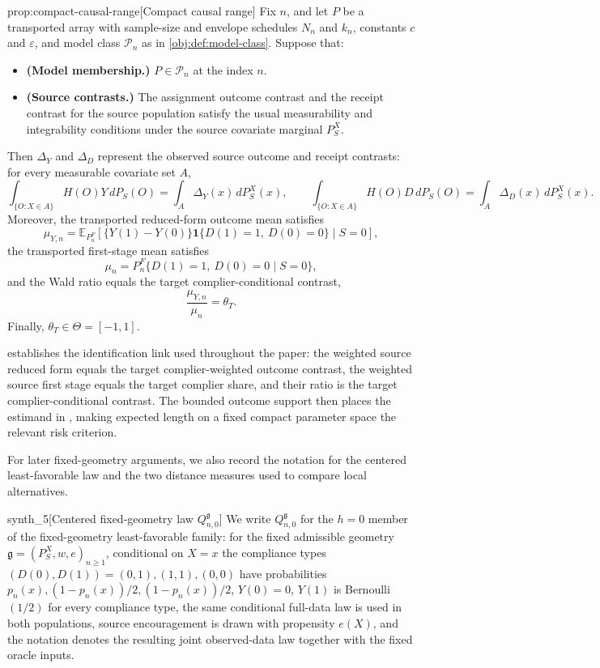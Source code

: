 \begin{theoremv}{prop:compact-causal-range}[Compact causal range]
Fix \(n\), and let \(P\) be a transported array with sample-size and envelope schedules \(N_n\) and \(k_n\), constants \(c\) and \(\varepsilon\), and model class \(\mathcal P_n\) as in \cref{obj:def:model-class}. Suppose that:
\begin{itemize}
\item \textbf{(Model membership.)} \(P\in\mathcal P_n\) at the index \(n\).
\item \textbf{(Source contrasts.)} The assignment outcome contrast and the receipt contrast for the source population satisfy the usual measurability and integrability conditions under the source covariate marginal \(P_S^X\).
\end{itemize}
Then \(\Delta_Y\) and \(\Delta_D\) represent the observed source outcome and receipt contrasts: for every measurable covariate set \(A\),
\[
\int_{\{O:X\in A\}} H(O)Y\,dP_S(O)
=
\int_A \Delta_Y(x)\,dP_S^X(x),
\qquad
\int_{\{O:X\in A\}} H(O)D\,dP_S(O)
=
\int_A \Delta_D(x)\,dP_S^X(x).
\]
Moreover, the transported reduced-form outcome mean satisfies
\[
\mu_{Y,n}
=
\mathbb E_{P_n^F}\!\left[
\{Y(1)-Y(0)\}\mathbf 1\{D(1)=1,\ D(0)=0\}\mid S=0
\right],
\]
the transported first-stage mean satisfies
\[
\mu_n
=
P_n^F\{D(1)=1,\ D(0)=0\mid S=0\},
\]
and the Wald ratio equals the target complier-conditional contrast,
\[
\frac{\mu_{Y,n}}{\mu_n}=\theta_T.
\]
Finally, \(\theta_T\in\Theta=[-1,1]\).
\end{theoremv}

 establishes the identification link used throughout the paper: the weighted source reduced form equals the target complier-weighted outcome contrast, the weighted source first stage equals the target complier share, and their ratio is the target complier-conditional contrast.  The bounded outcome support then places the estimand in , making expected length on a fixed compact parameter space the relevant risk criterion.

For later fixed-geometry arguments, we also record the notation for the centered least-favorable law and the two distance measures used to compare local alternatives.

\begin{definitionv}{synth_5}[Centered fixed-geometry law $Q_{n,0}^{\mathfrak g}$]
We write $Q_{n,0}^{\mathfrak g}$ for the $h=0$ member of the fixed-geometry least-favorable family: for the fixed admissible geometry $\mathfrak g=(P_S^X,w,e)_{n\ge1}$, conditional on $X=x$ the compliance types $(D(0),D(1))=(0,1),(1,1),(0,0)$ have probabilities $p_n(x),(1-p_n(x))/2,(1-p_n(x))/2$, $Y(0)=0$, $Y(1)$ is Bernoulli$(1/2)$ for every compliance type, the same conditional full-data law is used in both populations, source encouragement is drawn with propensity $e(X)$, and the notation denotes the resulting joint observed-data law together with the fixed oracle inputs.
\end{definitionv}

